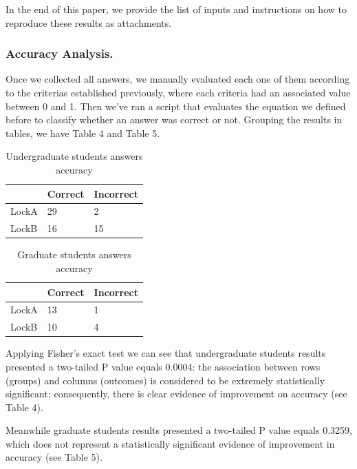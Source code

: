 In the end of this paper, we provide the list of inputs and instructions on how to reproduce these results as attachments.

\subsubsection{Accuracy Analysis.}

Once we collected all answers, we manually evaluated each one of them according to the criterias established previously, where each criteria had an associated value between 0 and 1. Then we've ran a script that evaluates the equation we defined before to classify whether an answer was correct or not. Grouping the results in tables, we have Table 4 and Table 5.

\begin{table}
\begin{center}
\caption{Undergraduate students answers accuracy}
\begin{tabular}{|l|l|l|}
\hline
 & Correct & Incorrect\\
\hline
LockA & 29 & 2\\
LockB & 16 & 15\\
\hline
\end{tabular}
\end{center}
\end{table}

\begin{table}
\begin{center}
\caption{Graduate students answers accuracy}
\begin{tabular}{|l|l|l|}
\hline
 & Correct & Incorrect\\
\hline
LockA & 13 & 1\\
LockB & 10 & 4\\
\hline
\end{tabular}
\end{center}
\end{table}

Applying Fisher's exact test we can see that undergraduate students results presented a two-tailed P value equals 0.0004: the association between rows (groups) and columns (outcomes) is considered to be extremely statistically significant; consequently, there is clear evidence of improvement on accuracy (see Table 4).

Meanwhile graduate students results presented a two-tailed P value equals 0.3259, which does not represent a statistically significant evidence of improvement in accuracy (see Table 5).

